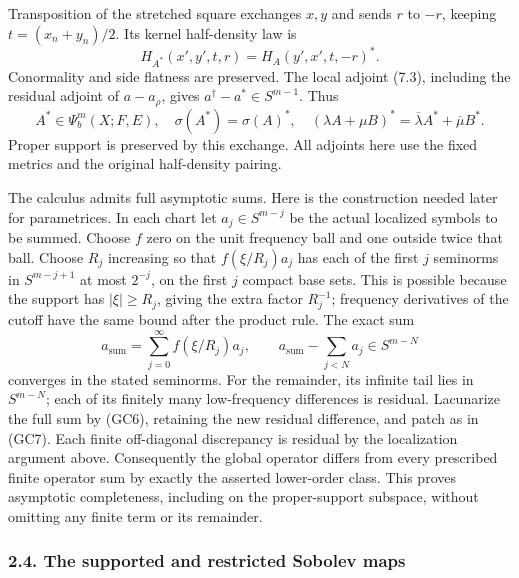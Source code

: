 \documentclass[
  11pt,
]{article}
\begin{document}
Transposition of the stretched square exchanges \(x,y\) and sends \(r\)
to \(-r\), keeping \(t=(x_n+y_n)/2\). Its kernel half-density law is \[
 H_{A^*}(x',y',t,r)=H_A(y',x',t,-r)^*.
 \tag{GC11}
\] Conormality and side flatness are preserved. The local adjoint (7.3),
including the residual adjoint of \(a-a_\rho\), gives
\(a^\dagger-a^*\in S^{m-1}\). Thus \[
 A^*\in\Psi_b^m(X;F,E),\quad
 \sigma(A^*)=\sigma(A)^*,\quad
 (\lambda A+\mu B)^*=\overline\lambda A^*+\overline\mu B^*.
 \tag{GC12}
\] Proper support is preserved by this exchange. All adjoints here use
the fixed metrics and the original half-density pairing.

The calculus admits full asymptotic sums. Here is the construction
needed later for parametrices. In each chart let \(a_j\in S^{m-j}\) be
the actual localized symbols to be summed. Choose \(f\) zero on the unit
frequency ball and one outside twice that ball. Choose \(R_j\)
increasing so that \(f(\xi/R_j)a_j\) has each of the first \(j\)
seminorms in \(S^{m-j+1}\) at most \(2^{-j}\), on the first \(j\)
compact base sets. This is possible because the support has
\(|\xi|\ge R_j\), giving the extra factor \(R_j^{-1}\); frequency
derivatives of the cutoff have the same bound after the product rule.
The exact sum \[
 a_{\mathrm{sum}}=\sum_{j=0}^\infty f(\xi/R_j)a_j,
 \qquad
 a_{\mathrm{sum}}-\sum_{j<N}a_j\in S^{m-N}
 \tag{GC13}
\] converges in the stated seminorms. For the remainder, its infinite
tail lies in \(S^{m-N}\); each of its finitely many low-frequency
differences is residual. Lacunarize the full sum by (GC6), retaining the
new residual difference, and patch as in (GC7). Each finite off-diagonal
discrepancy is residual by the localization argument above. Consequently
the global operator differs from every prescribed finite operator sum by
exactly the asserted lower-order class. This proves asymptotic
completeness, including on the proper-support subspace, without omitting
any finite term or its remainder.

\subsubsection{2.4. The supported and restricted Sobolev
maps}\label{the-supported-and-restricted-sobolev-maps}
\end{document}
